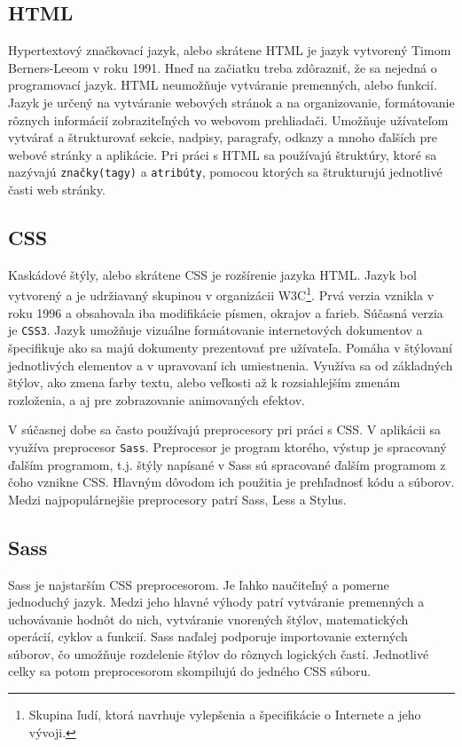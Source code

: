 \subsection{HTML}
Hypertextový značkovací jazyk\cite{html}, alebo skrátene HTML je jazyk vytvorený Timom Berners-Leeom v roku 1991. Hneď na začiatku treba zdôrazniť, že sa nejedná o programovací jazyk. HTML neumožňuje vytváranie premenných, alebo funkcií. Jazyk je určený na vytváranie webových stránok a na organizovanie, formátovanie rôznych informácií zobraziteľných vo webovom prehliadači. Umožňuje užívateľom vytvárať 
a štrukturovať sekcie, nadpisy, paragrafy, odkazy a mnoho ďalších pre webové stránky a aplikácie. Pri práci s HTML sa používajú štruktúry, ktoré sa nazývajú \texttt{značky(tagy)} a \texttt{atribúty}, pomocou ktorých sa štrukturujú jednotlivé časti web stránky. 

\subsection{CSS}
Kaskádové štýly\cite{css}, alebo skrátene CSS je rozšírenie jazyka HTML. Jazyk bol vytvorený a je udržiavaný skupinou v organizácii W3C\footnote{Skupina ľudí, ktorá navrhuje vylepšenia a špecifikácie o Internete a jeho vývoji.}.  Prvá verzia vznikla v roku 1996 a obsahovala iba modifikácie písmen, okrajov a farieb. Súčasná verzia je \texttt{CSS3}. Jazyk umožňuje vizuálne formátovanie internetových dokumentov a špecifikuje ako sa majú dokumenty prezentovať pre užívateľa. Pomáha v štýlovaní jednotlivých elementov a v upravovaní ich umiestnenia. Využíva sa od základných 
štýlov, ako zmena farby textu, alebo veľkosti až k rozsiahlejším zmenám rozloženia, a aj pre zobrazovanie animovaných efektov. 

V súčasnej dobe sa často používajú preprocesory pri práci s CSS. V aplikácii sa využíva preprocesor \texttt{Sass}. Preprocesor\cite{sass} je program ktorého, výstup je spracovaný ďalším programom, t.j. štýly napísané v Sass sú spracované ďalším programom z čoho vznikne CSS. Hlavným dôvodom ich použitia je prehľadnosť kódu a súborov. Medzi najpopulárnejšie preprocesory patrí Sass, Less a Stylus.

\subsection*{Sass}
Sass\cite{sass} je najstarším CSS preprocesorom. Je ľahko naučiteľný a pomerne jednoduchý jazyk. Medzi jeho hlavné výhody patrí vytváranie premenných a uchovávanie hodnôt do nich, vytváranie vnorených štýlov, matematických operácií, cyklov a funkcií. Sass naďalej podporuje importovanie externých súborov, čo umožňuje rozdelenie štýlov do rôznych logických častí. Jednotlivé celky sa potom preprocesorom skompilujú do jedného CSS súboru. 

